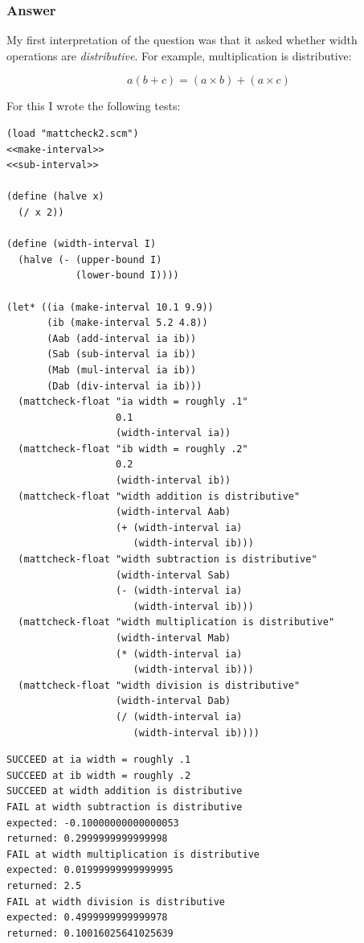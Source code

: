 \documentclass[final,fleqn,titlepage,twoside]{article}
\begin{document}
\subsubsection{Answer}
\label{sec:org0bdafe5}
My first interpretation of the question was that it asked whether width
operations are \emph{distributive}. For example, multiplication is distributive:

\[
  a(b+c) = (a \times b)+(a \times c)
\]

For this I wrote the following tests:

\begin{verbatim}
(load "mattcheck2.scm")
<<make-interval>>
<<sub-interval>>

(define (halve x)
  (/ x 2))

(define (width-interval I)
  (halve (- (upper-bound I)
            (lower-bound I))))

(let* ((ia (make-interval 10.1 9.9))
       (ib (make-interval 5.2 4.8))
       (Aab (add-interval ia ib))
       (Sab (sub-interval ia ib))
       (Mab (mul-interval ia ib))
       (Dab (div-interval ia ib)))
  (mattcheck-float "ia width = roughly .1"
                   0.1
                   (width-interval ia))
  (mattcheck-float "ib width = roughly .2"
                   0.2
                   (width-interval ib))
  (mattcheck-float "width addition is distributive"
                   (width-interval Aab)
                   (+ (width-interval ia)
                      (width-interval ib)))
  (mattcheck-float "width subtraction is distributive"
                   (width-interval Sab)
                   (- (width-interval ia)
                      (width-interval ib)))
  (mattcheck-float "width multiplication is distributive"
                   (width-interval Mab)
                   (* (width-interval ia)
                      (width-interval ib)))
  (mattcheck-float "width division is distributive"
                   (width-interval Dab)
                   (/ (width-interval ia)
                      (width-interval ib))))
\end{verbatim}

\begin{verbatim}
SUCCEED at ia width = roughly .1
SUCCEED at ib width = roughly .2
SUCCEED at width addition is distributive
FAIL at width subtraction is distributive
expected: -0.10000000000000053
returned: 0.2999999999999998
FAIL at width multiplication is distributive
expected: 0.01999999999999995
returned: 2.5
FAIL at width division is distributive
expected: 0.4999999999999978
returned: 0.10016025641025639
\end{verbatim}
\end{document}
